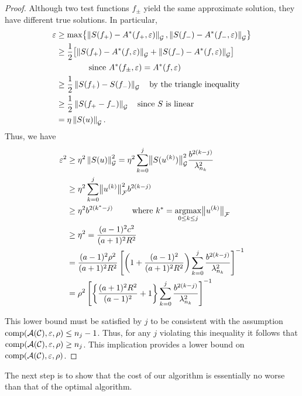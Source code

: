 \documentclass[graybox,footinfo]{svmult}
\newcommand{\DHJRnorm}[2][{}]{\ensuremath{\left \lVert #2 \right \rVert}_{#1}}
\newcommand{\DHJRbignorm}[2][{}]{\ensuremath{\bigl \lVert #2 \bigr \rVert}_{#1}}
\begin{document}
\begin{proof}
Although two test functions $f_\pm$ yield the same approximate solution, they have different true solutions.  In particular,
\begin{align*}
\varepsilon &\ge \max \bigl\{\DHJRnorm[\calG]{S(f_+) - A^*(f_+,\varepsilon)}, \DHJRnorm[\calG]{S(f_-) - A^*(f_-,\varepsilon)} \bigr\} \\
&\ge \frac 12 \bigl[\DHJRnorm[\calG]{S(f_+) - A^*(f,\varepsilon)} + \DHJRnorm[\calG]{S(f_-) - A^*(f,\varepsilon)}  \bigr] \\
&\qquad \qquad \text{since } A^*(f_\pm,\varepsilon) = A^*(f,\varepsilon) \\
&\ge \frac 12 \DHJRnorm[\calG]{S(f_+) - S(f_-)} \quad \text{by the triangle inequality}\\
&\ge \frac 12 \DHJRnorm[\calG]{S(f_+ - f_-)} \quad \text{since $S$ is linear}\\
&= \eta \DHJRnorm[\calG]{S(u)}.
\end{align*}
Thus, we have
\begin{align*}
\varepsilon^2  & \ge \eta^2 \DHJRnorm[\calG]{S(u)}^2= 
\eta^2 \sum_{k=0}^{j} \DHJRbignorm[\calG]{S(u^{(k)})}^2  \frac{b^{2(k-j)}}{\lambda_{n_k}^2}\\
& \ge \eta^2 
\sum_{k=0}^{j} \DHJRbignorm[\calF]{u^{(k)}}^2 
b^{2(k-j)}\\
& \ge  \eta^2 b^{2(k^{*}-j)} \qquad \text{ where } k^* = \argmax_{0 \le k \le j} \DHJRbignorm[\calF]{u^{(k)}} \\
& \ge \eta^2 = \frac{(a-1)^2c^2}{(a+1)^2R^2} \\
&
=\frac{(a-1)^2 \rho^2}{(a+1)^2R^2}\left[\left(1+\frac{(a-1)^2}{(a+1)^{2} R^2 }\right)\sum_{k=0}^j \frac{b^{2(k-j)}}{\lambda_{n_{k}}^2}\right]^{-1} \\
& =  \rho^2 \left[\left\{\frac{(a+1)^{2} R^2 }{(a-1)^2} + 1\right\}\sum_{k=0}^j \frac{b^{2(k-j)}}{\lambda_{n_{k}}^2}\right]^{-1} 
\end{align*}

This lower bound must be satisfied by $j$ to be consistent with the assumption $\textup{comp}({\mathcal{A}}({\mathcal{C}}),\varepsilon,\rho) \le n_j - 1$.  Thus, for any $j$ violating this inequality it follows that $\textup{comp}({\mathcal{A}}({\mathcal{C}}),\varepsilon,\rho) \ge n_j$.  This implication provides a lower bound on $\textup{comp}({\mathcal{A}}({\mathcal{C}}),\varepsilon,\rho)$.
\end{proof}

The next step is to show that the cost of our algorithm is essentially no worse than that of the optimal algorithm.
\end{document}
